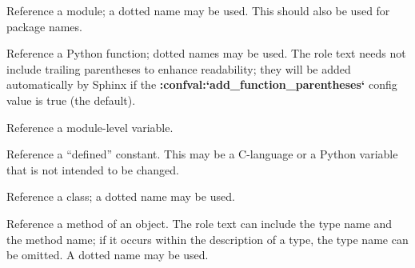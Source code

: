 \documentclass[letterpaper,10pt,english]{sphinxmanual}
\begin{document}
\begin{fulllineitems}
\label{domains:role-py:mod}
Reference a module; a dotted name may be used.  This should also be used for
package names.

\end{fulllineitems}


\begin{fulllineitems}
\label{domains:role-py:func}
Reference a Python function; dotted names may be used.  The role text needs
not include trailing parentheses to enhance readability; they will be added
automatically by Sphinx if the {\color{red}\bfseries{}:confval:{}`add\_function\_parentheses{}`} config
value is true (the default).

\end{fulllineitems}


\begin{fulllineitems}
\label{domains:role-py:data}
Reference a module-level variable.

\end{fulllineitems}


\begin{fulllineitems}
\label{domains:role-py:const}
Reference a ``defined'' constant.  This may be a C-language  or a
Python variable that is not intended to be changed.

\end{fulllineitems}


\begin{fulllineitems}
\label{domains:role-py:class}
Reference a class; a dotted name may be used.

\end{fulllineitems}


\begin{fulllineitems}
\label{domains:role-py:meth}
Reference a method of an object.  The role text can include the type name and
the method name; if it occurs within the description of a type, the type name
can be omitted.  A dotted name may be used.

\end{fulllineitems}
\end{document}
